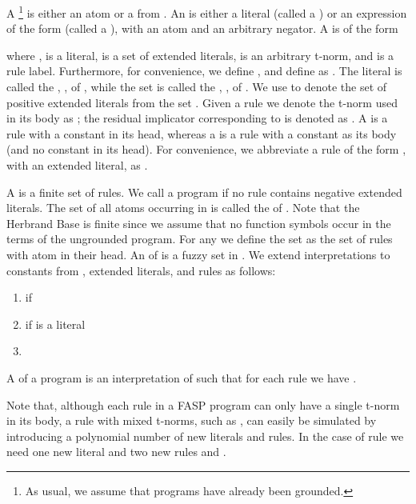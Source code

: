 \documentclass{tlp}
\begin{document}
A \footnote{As usual, we assume that programs have already been grounded.} is either an atom  or a  from . An  is either a literal (called a ) or an expression of the form  (called a ), with  an atom and  an arbitrary negator. A   is of the form 
  
 where ,  is a literal,  is a set of extended literals,  is an arbitrary t-norm, and  is a rule label. Furthermore, for convenience, we define , and define  as . The literal  is called the , , of , while the set  is called the , , of . We use  to denote the set of positive extended literals from the set .
 Given a rule  we denote the t-norm used in its body as ; the residual implicator corresponding to  is denoted as .
 A  is a rule with a constant in its head, whereas a  is a rule with a constant as its body (and no
constant in its head). For convenience, we abbreviate a rule of the form , with  an extended literal, as .
 


 A   is a finite set of rules. We call a program  if no rule contains negative extended literals. The set of all atoms occurring in  is called the   of . Note that the Herbrand Base is finite since we assume that no function symbols occur in the terms of the ungrounded program. For any  we define the set  as the set of rules with atom  in their head. An   of  is a fuzzy set in . We extend interpretations to constants from , extended literals, and rules as follows:
 \begin{enumerate}
   \item  if 
   \item  if  is a literal
   \item 
\end{enumerate}
 A  of a program  is an interpretation  of  such that for each rule  we have .


 Note that, although each rule in a FASP program can only have a single t-norm in its body, a rule with mixed t-norms, such as , can easily be simulated by introducing a polynomial number of new literals and rules. In the case of rule  we need one new literal  and two new rules  and .
 
\end{document}
